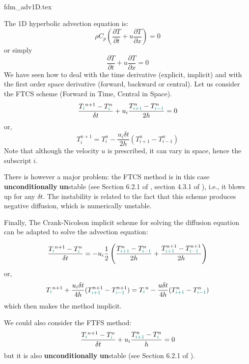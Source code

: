 \begin{flushright} {\tiny {\color{gray} fdm\_adv1D.tex}} \end{flushright}

%


The 1D hyperbolic advection equation is:
\begin{equation}
\rho C_p \left( \frac{\partial T}{\partial t}  
+ u \frac{\partial T}{\partial x} \right)=0 
\end{equation}
or simply
\begin{equation}
\frac{\partial T}{\partial t} + u \frac{\partial T}{\partial x}=0 
\end{equation}
We have seen how to deal with the time derivative (explicit, implicit) 
and with the first order space derivative (forward, backward or central).
Let us consider the FTCS scheme (Forward in Time, Central in Space).
\[
\frac{T_{\color{teal}i}^{n+1}-T^n_{\color{teal}i}}{\delta t} 
+ u_i \frac{T^n_{\color{teal}i+1} - T^n_{{\color{teal}i-1}}}{2h} =0 
\]
or,
\[
T_i^{n+1} = T_i^n - \frac{u_i \delta t}{2 h} (T_{i+1}^n-T_{i-1}^n)
\]
Note that although the velocity $u$ is prescribed, it can vary in space, hence
the subscript $i$. 



There is however a major problem: 
the FTCS method is in this case {\bf unconditionally} {\bf un}stable (see Section 6.2.1 
of \cite{hoch}, section 4.3.1 of \cite{pell08}), i.e., it blows up for any $\delta t$.
The instability is related to the fact that this scheme produces negative diffusion, 
which is numerically unstable.


Finally, The Crank-Nicolson implicit scheme for solving the diffusion equation 
can be adapted to solve the advection equation:

\[
\frac{T_{\color{teal}i}^{n+1}-T^n_{\color{teal}i}}{\delta t} 
=- u_i 
\frac12 \left(
\frac{T^n_{\color{teal}i+1} - T^n_{{\color{teal}i-1}}}{2h} 
+
\frac{T^{n+1}_{\color{teal}i+1} - T^{n+1}_{{\color{teal}i-1}}}{2h} 
\right)
\]
or,
\[
T_{\color{teal}i}^{n+1} + \frac{u_i \delta t}{4h} (T_{{\color{teal}i+1}}^{n+1}-T_{{\color{teal}i-1}}^{n+1}) 
= T_{\color{teal}i}^n - \frac{u \delta t}{4h} (T_{{\color{teal}i+1}}^{n}-T_{{\color{teal}i-1}}^{n}) 
\]
which then makes the method implicit.








We could also consider the FTFS method:
\[
\frac{T_{\color{teal}i}^{n+1}-T^n_{\color{teal}i}}{\delta t} 
+ u_i \frac{T^n_{\color{teal}i+1} - T^n_{{\color{teal}i}}}{h} =0 
\]
but it is also {\bf unconditionally} {\bf un}stable (see Section 6.2.1 of \cite{hoch}).

